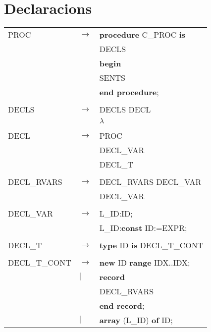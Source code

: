 \documentclass{article}
\begin{document}
	\section{Declaracions}

	\begin{tabular}{l l l}
		PROC&$\to$&\textbf{procedure} C\_PROC \textbf{is}\\
		&&\hspace*{5mm}DECLS\\
		&&\textbf{begin}\\
		&&\hspace*{5mm}SENTS\\
		&&\textbf{end procedure};\\
		\\
		DECLS&$\to$&DECLS DECL\\
		&\textbar&$\lambda$\\
		\\
		DECL&$\to$&PROC\\
		&\textbar&DECL\_VAR\\
		&\textbar&DECL\_T\\
		\\
		DECL\_RVARS&$\to$&DECL\_RVARS DECL\_VAR\\
		&\textbar&DECL\_VAR\\
		\\
		DECL\_VAR&$\to$&L\_ID:ID;\\
		&\textbar&L\_ID:\textbf{const} ID:=EXPR;\\
		\\
		DECL\_T&$\to$&\textbf{type} ID \textbf{is} DECL\_T\_CONT\\
		\\
		DECL\_T\_CONT&$\to$&\textbf{new} ID \textbf{range} IDX..IDX;\\
		&$|$&\textbf{record}\\
		&&\hspace*{5mm}DECL\_RVARS\\
		&&\textbf{end record};\\
		&$|$&\textbf{array} (L\_ID) \textbf{of} ID;
	\end{tabular}
\end{document}
